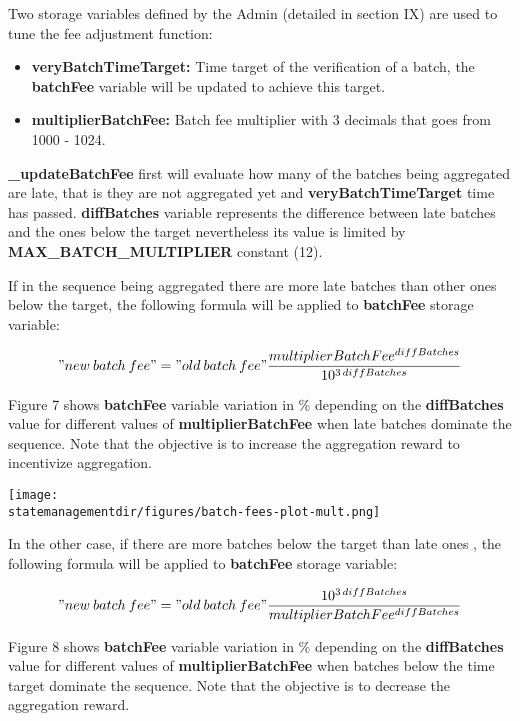 Two storage variables defined by the Admin (detailed in section IX) are used to tune the fee adjustment function:
\begin{itemize}
	\item \textbf{veryBatchTimeTarget:} Time target of the verification of a batch, the \textbf{batchFee} variable will be updated to achieve this target.
	\item \textbf{multiplierBatchFee:} Batch fee multiplier with 3 decimals that goes from 1000 - 1024.
\end{itemize}

\textbf{\_updateBatchFee} first will evaluate how many of the batches being aggregated are late, that is they are not aggregated yet and \textbf{veryBatchTimeTarget} time has passed. \textbf{diffBatches} variable represents the difference between late batches and the ones below the target nevertheless its value is limited by \textbf{MAX\_BATCH\_MULTIPLIER} constant (12).

If in the sequence being aggregated there are more late batches than other ones below the target, the following formula will be applied to \textbf{batchFee} storage variable:

$$"new\: batch\: fee" = "old\: batch\: fee"\frac{multiplierBatchFee^{diffBatches}}{10^{3\,diffBatches}}$$

Figure 7 shows \textbf{batchFee} variable variation in \% depending on the \textbf{diffBatches} value for different values of \textbf{multiplierBatchFee} when late batches dominate the sequence. Note that the objective is to increase the aggregation reward to incentivize aggregation.

\begin{center}
	\texttt{[image: \\statemanagementdir/figures/batch-fees-plot-mult.png]}
	
\end{center}


In the other case, if there are more batches below the target than late ones , the following formula will be applied to \textbf{batchFee} storage variable:

$$"new\: batch\: fee" = "old\: batch\: fee"\frac{10^{3\,diffBatches}}{multiplierBatchFee^{diffBatches}}$$

Figure 8 shows \textbf{batchFee} variable variation in \% depending on the \textbf{diffBatches} value for different values of \textbf{multiplierBatchFee} when batches below the time target 
dominate the sequence. Note that the objective is to decrease the aggregation reward.

